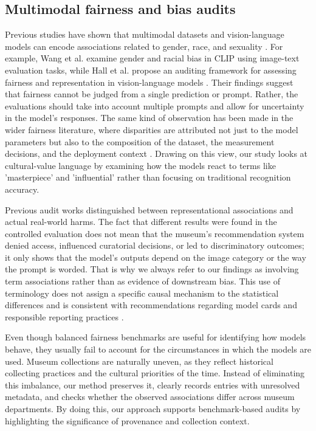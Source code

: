 \documentclass[pdflatex,sn-basic,Numbered]{sn-jnl}
\begin{document}
\subsection{Multimodal fairness and bias audits}

Previous studies have shown that multimodal datasets and vision-language models can encode associations related to gender, race, and sexuality \cite{birhane2021multimodal, wolfe2022evidence}. For example, Wang et al. examine gender and racial bias in CLIP using image-text evaluation tasks, while Hall et al. propose an auditing framework for assessing fairness and representation in vision-language models \cite{wang2022revisiting, hall2023auditing}. Their findings suggest that fairness cannot be judged from a single prediction or prompt. Rather, the evaluations should take into account multiple prompts and allow for uncertainty in the model's responses. The same kind of observation has been made in the wider fairness literature, where disparities are attributed not just to the model parameters but also to the composition of the dataset, the measurement decisions, and the deployment context \cite{buolamwini2018gender, mitchell2019model}. Drawing on this view, our study looks at cultural-value language by examining how the models react to terms like 'masterpiece' and 'influential' rather than focusing on traditional recognition accuracy.

Previous audit works distinguished between representational associations and actual real-world harms. The fact that different results were found in the controlled evaluation does not mean that the museum's recommendation system denied access, influenced curatorial decisions, or led to discriminatory outcomes; it only shows that the model's outputs depend on the image category or the way the prompt is worded. That is why we always refer to our findings as involving term associations rather than as evidence of downstream bias. This use of terminology does not assign a specific causal mechanism to the statistical differences and is consistent with recommendations regarding model cards and responsible reporting practices \cite{mitchell2019model}.

Even though balanced fairness benchmarks are useful for identifying how models behave, they usually fail to account for the circumstances in which the models are used. Museum collections are naturally uneven, as they reflect historical collecting practices and the cultural priorities of the time. Instead of eliminating this imbalance, our method preserves it, clearly records entries with unresolved metadata, and checks whether the observed associations differ across museum departments. By doing this, our approach supports benchmark-based audits by highlighting the significance of provenance and collection context.
\end{document}
